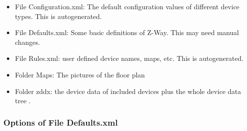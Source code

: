 \begin{itemize}
\item File Configuration.xml: The default configuration values of different device types. This is autogenerated.
\item File Defaults.xml: Some basic definitions of Z-Way. This may need manual changes.
\item File Rules.xml: user defined device names, maps, etc. This is autogenerated.
\item Folder Maps: The pictures of the floor plan
\item Folder zddx: the device data of included devices plus the whole device data tree . 
\end{itemize}

\subsubsection{Options of File Defaults.xml}

